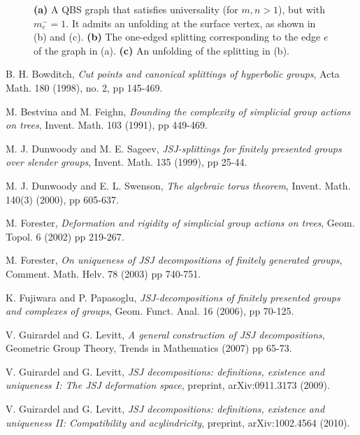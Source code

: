 \documentclass[12pt]{amsart}
\begin{document}
\begin{figure}[htbp]
\begin{center}

\caption{{\bf (a)} A QBS graph that satisfies universality (for $m,n > 1$), but with $m^-_e = 1$. It admits an unfolding at the surface vertex, as shown in (b) and (c). {\bf (b)} The one-edged splitting corresponding to the edge $e$ of the graph in (a). {\bf (c)} An unfolding of the splitting in (b).}
\label{fig1}
\end{center}
\end{figure}


\newpage

\begin{thebibliography}{9}


 B. H. Bowditch, {\em Cut points and canonical splittings of hyperbolic groups}, Acta Math. 180 (1998), no. 2, pp 145-469. 

 M. Bestvina and M. Feighn, {\em Bounding the complexity of simplicial group actions on trees}, Invent. Math. 103 (1991), pp 449-469.

 M. J. Dunwoody and M. E. Sageev, {\em JSJ-splittings for finitely presented groups over slender groups}, Invent. Math. 135 (1999), pp 25-44. 

 M. J. Dunwoody and E. L. Swenson, {\em The algebraic torus theorem}, Invent. Math. 140(3) (2000), pp 605-637.

 M. Forester, {\em Deformation and rigidity of simplicial group actions on trees}, Geom. Topol. 6 (2002) pp 219-267.

 M. Forester, {\em On uniqueness of JSJ decompositions of finitely generated groups}, Comment. Math. Helv. 78 (2003) pp 740-751.

 K. Fujiwara and P. Papasoglu, {\em JSJ-decompositions of finitely presented groups and complexes of groups}, Geom. Funct. Anal. 16 (2006), pp 70-125.


 V. Guirardel and G. Levitt, {\em A general construction of JSJ decompositions}, Geometric Group Theory, Trends in Mathematics (2007) pp 65-73.

 V. Guirardel and G. Levitt, {\em JSJ decompositions: definitions, existence and uniqueness I: The JSJ deformation space}, preprint, arXiv:0911.3173 (2009).

 V. Guirardel and G. Levitt, {\em JSJ decompositions: definitions, existence and uniqueness II: Compatibility and acylindricity}, preprint, arXiv:1002.4564 (2010).



\end{thebibliography}
\end{document}
